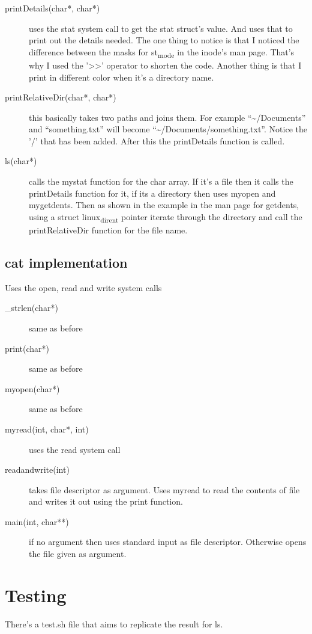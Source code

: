 \documentclass[11pt]{article}
\begin{document}
\begin{description}
\item[{printDetails(char*, char*)}] uses the stat system call to get the stat struct's value. And uses that to print out the details needed. The one thing to notice is that I noticed the difference between the masks for st\textsubscript{mode} in the inode's man page. That's why I used the '>>' operator to shorten the code. Another thing is that I print in different color when it's a directory name.
\item[{printRelativeDir(char*, char*)}] this basically takes two paths and joins them. For example ``\textasciitilde{}/Documents'' and ``something.txt'' will become ``\textasciitilde{}/Documents/something.txt''. Notice the '/' that has been added. After this the printDetails function is called.
\item[{ls(char*)}] calls the mystat function for the char array. If it's a file then it calls the printDetails function for it, if its a directory then uses myopen and mygetdents. Then as shown in the example in the man page for getdents, using a struct linux\textsubscript{dirent} pointer iterate through the directory and call the printRelativeDir function for the file name.
\end{description}
\subsection{cat implementation}
\label{sec:org323205f}
Uses the open, read and write system calls
\begin{description}
\item[{\_strlen(char*)}] same as before
\item[{print(char*)}] same as before
\item[{myopen(char*)}] same as before
\item[{myread(int, char*, int)}] uses the read system call
\item[{readandwrite(int)}] takes file descriptor as argument. Uses myread to read the contents of file and writes it out using the print function.
\item[{main(int, char**)}] if no argument then uses standard input as file descriptor. Otherwise opens the file given as argument.
\end{description}


\section{Testing}
\label{sec:org51dcefa}
There's a test.sh file that aims to replicate the result for ls.
\end{document}
